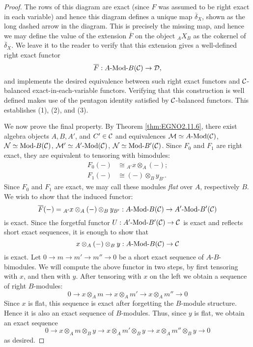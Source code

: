\documentclass{amsart}
\begin{document}
\begin{proof}
The rows of this diagram are exact (since $F$ was assumed to be right exact in each variable) and hence this diagram defines a unique map $\overline{\delta}_X$, shown as the long dashed arrow in the diagram. This is precisely the missing map, and hence we may define the value of the extension $\overline{F}$ on the object ${}_AX_B$ as the cokernel of $\overline{\delta}_X$. We leave it to the reader to verify that this extension gives a well-defined right exact functor 
\begin{equation*}
	\overline{F}: \Mod{A}{B}(\cC) \to \cD,
\end{equation*} 
and implements the desired equivalence between such right exact functors and $\mathcal C$-balanced exact-in-each-variable functors. Verifying that this construction is well defined makes use of the pentagon identity satisfied by $\mathcal C$-balanced functors. This establishes (1), (2), and (3). 

We now prove the final property. By Theorem \ref{thm:EGNO2.11.6}, there exist algebra objects $A, B, A'$, and $C' \in \mathcal C$ and equivalences $\cM \simeq \Mod{A}{}(\cC)$, $\cN \simeq \Mod{}{B}(\cC)$, $\cM' \simeq \Mod{A'}{}(\cC)$, $\cN \simeq \Mod{}{B'}(\cC)$. Since $F_0$ and $F_1$ are right exact, they are equivalent to tensoring with bimodules:
\begin{align*}
	F_0(-) &\cong {}_{A'}x \otimes_A (-); \\
	F_1(-) & \cong (-) \otimes_B y_{B'}.
\end{align*}
Since $F_0$ and $F_1$ are exact, we may call these modules {\em flat} over $A$, respectively $B$. We wish to show that the induced functor:
\begin{equation*}
	\overline{F}(-) = {}_{A'}x \otimes_A (-) \otimes_B y_{B'}: \Mod{A}{B}(\cC) \to \Mod{A'}{B'}(\cC)
\end{equation*}
is exact. Since the forgetful functor $U: \Mod{A'}{B'}(\cC) \to \cC$ is exact and reflects short exact sequences, it is enough to show that 
\begin{equation*}
	x \otimes_A (-) \otimes_B y: \Mod{A}{B}(\cC) \to \cC
\end{equation*}
is exact. Let $0 \to m \to m' \to m'' \to 0$ be a short exact sequence of $A$-$B$-bimodules. We will compute the above functor in two steps, by first tensoring with $x$, and then with $y$. After tensoring with $x$ on the left we obtain a sequence of right $B$-modules:
\begin{equation*}
	0 \to x \otimes_A m \to x \otimes_A m' \to x \otimes_A {m''} \to 0
\end{equation*}
Since $x$ is flat, this sequence is exact after forgetting the $B$-module structure. Hence it is also an exact sequence of $B$-modules. Thus, since $y$ is flat, we obtain an exact sequence
\begin{equation*}
		0 \to x \otimes_A m \otimes_B y \to x \otimes_A m'\otimes_B y \to x \otimes_A {m''}  \otimes_B y \to 0
\end{equation*}
	as desired. 
\end{proof}
\end{document}
